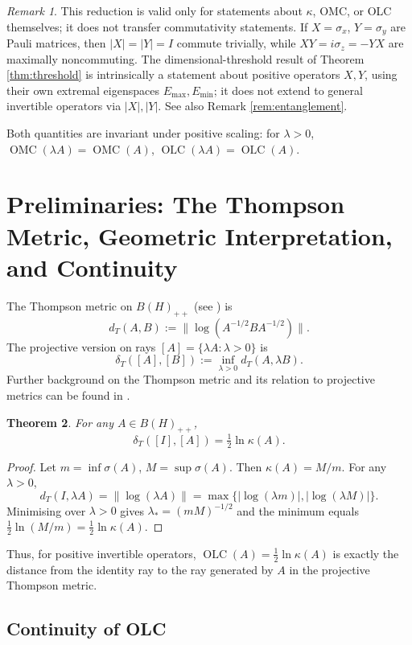 \documentclass{article}
\newtheorem{theorem}{Theorem}[section]
\theoremstyle{remark}
\newtheorem{remark}[theorem]{Remark}
\providecommand{\QLC}{\operatorname{OLC}}
\providecommand{\QMC}{\operatorname{OMC}}
\providecommand{\Emax}{E_{\max}}
\providecommand{\Emin}{E_{\min}}
\begin{document}
\begin{remark}\label{rem:polar}
This reduction is valid only for statements about $\kappa$, OMC, or OLC themselves; it does not transfer commutativity statements. If $X=\sigma_x$, $Y=\sigma_y$ are Pauli matrices, then $|X|=|Y|=I$ commute trivially, while $XY=i\sigma_z=-YX$ are maximally noncommuting. The dimensional-threshold result of Theorem \ref{thm:threshold} is intrinsically a statement about positive operators $X,Y$, using their own extremal eigenspaces $\Emax,\Emin$; it does not extend to general invertible operators via $|X|,|Y|$. See also Remark \ref{rem:entanglement}.
\end{remark}

Both quantities are invariant under positive scaling: for $\lambda>0$, $\QMC(\lambda A)=\QMC(A)$, $\QLC(\lambda A)=\QLC(A)$.


\section{Preliminaries: The Thompson Metric, Geometric Interpretation, and Continuity}

The Thompson metric on $B(H)_{++}$ (see \cite{thompson1963,corach1994}) is
\[
d_T(A,B) := \|\log(A^{-1/2}BA^{-1/2})\|.
\]
The projective version on rays $[A]=\{\lambda A:\lambda>0\}$ is
\[
\delta_T([A],[B]) := \inf_{\lambda>0} d_T(A,\lambda B).
\]
Further background on the Thompson metric and its relation to projective metrics can be found in \cite{lawson2001}.

\begin{theorem}\label{thm:thompson}
For any $A\in B(H)_{++}$,
\[
\delta_T([I],[A]) = \tfrac12\ln\kappa(A). \tag{1}
\]
\end{theorem}
\begin{proof}
Let $m=\inf\sigma(A)$, $M=\sup\sigma(A)$. Then $\kappa(A)=M/m$. For any $\lambda>0$,
\[
d_T(I,\lambda A) = \|\log(\lambda A)\| = \max\{|\log(\lambda m)|,|\log(\lambda M)|\}.
\]
Minimising over $\lambda>0$ gives $\lambda_*=(mM)^{-1/2}$ and the minimum equals $\tfrac12\ln(M/m)=\tfrac12\ln\kappa(A)$.
\end{proof}

Thus, for positive invertible operators, $\QLC(A)=\tfrac12\ln\kappa(A)$ is exactly the distance from the identity ray to the ray generated by $A$ in the projective Thompson metric.

\subsection{Continuity of OLC}
\end{document}
